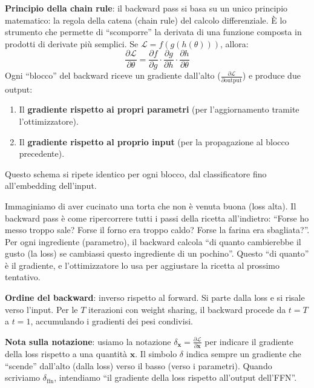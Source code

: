 \documentclass[12pt,a4paper]{article}
\begin{document}
\textbf{Principio della chain rule}: il backward pass si basa su un unico principio matematico: la regola della catena (chain rule) del calcolo differenziale. \`E lo strumento che permette di ``scomporre'' la derivata di una funzione composta in prodotti di derivate pi\`u semplici. Se $\mathcal{L} = f(g(h(\theta)))$, allora:
\[
    \frac{\partial \mathcal{L}}{\partial \theta} = \frac{\partial f}{\partial g} \cdot \frac{\partial g}{\partial h} \cdot \frac{\partial h}{\partial \theta}
\]
Ogni ``blocco'' del backward riceve un gradiente dall'alto ($\frac{\partial \mathcal{L}}{\partial \text{output}}$) e produce due output:
\begin{enumerate}
    \item Il \textbf{gradiente rispetto ai propri parametri} (per l'aggiornamento tramite l'ottimizzatore).
    \item Il \textbf{gradiente rispetto al proprio input} (per la propagazione al blocco precedente).
\end{enumerate}
Questo schema si ripete identico per ogni blocco, dal classificatore fino all'embedding dell'input.

\begin{notabox}
Immaginiamo di aver cucinato una torta che non \`e venuta buona (loss alta). Il backward pass \`e come ripercorrere tutti i passi della ricetta all'indietro: ``Forse ho messo troppo sale? Forse il forno era troppo caldo? Forse la farina era sbagliata?''. Per ogni ingrediente (parametro), il backward calcola ``di quanto cambierebbe il gusto (la loss) se cambiassi questo ingrediente di un pochino''. Questo ``di quanto'' \`e il gradiente, e l'ottimizzatore lo usa per aggiustare la ricetta al prossimo tentativo.
\end{notabox}

\textbf{Ordine del backward}: inverso rispetto al forward. Si parte dalla loss e si risale verso l'input. Per le $T$ iterazioni con weight sharing, il backward procede da $t = T$ a $t = 1$, accumulando i gradienti dei pesi condivisi.

\textbf{Nota sulla notazione}: usiamo la notazione $\delta_{\mathbf{x}} = \frac{\partial \mathcal{L}}{\partial \mathbf{x}}$ per indicare il gradiente della loss rispetto a una quantit\`a $\mathbf{x}$. Il simbolo $\delta$ indica sempre un gradiente che ``scende'' dall'alto (dalla loss) verso il basso (verso i parametri). Quando scriviamo $\delta_{\text{ffn}}$, intendiamo ``il gradiente della loss rispetto all'output dell'FFN''.
\end{document}
